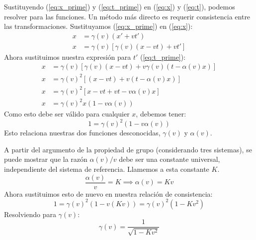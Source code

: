 \documentclass[11pt,a4paper]{article}
\begin{document}
Sustituyendo (\ref{eq:x_prime}) y (\ref{eq:t_prime}) en (\ref{eq:x}) y (\ref{eq:t}), podemos resolver para las funciones. Un método más directo es requerir consistencia entre las transformaciones. Sustituyamos (\ref{eq:x_prime}) en (\ref{eq:x}):
\begin{align*}
x &= \gamma(v)(x' + vt') \\
x &= \gamma(v)[\gamma(v)(x-vt) + v t']
\end{align*}
Ahora sustituimos nuestra expresión para $t'$ (\ref{eq:t_prime}):
\begin{align*}
x &= \gamma(v)[\gamma(v)(x-vt) + v \gamma(v)(t - \alpha(v)x)] \\
x &= \gamma(v)^2 [ (x-vt) + v(t-\alpha(v)x) ] \\
x &= \gamma(v)^2 [ x - vt + vt - v\alpha(v)x ] \\
x &= \gamma(v)^2 x (1 - v\alpha(v))
\end{align*}
Como esto debe ser válido para cualquier $x$, debemos tener:
\[ 1 = \gamma(v)^2 (1 - v\alpha(v)) \]
Esto relaciona nuestras dos funciones desconocidas, $\gamma(v)$ y $\alpha(v)$.

A partir del argumento de la propiedad de grupo (considerando tres sistemas), se puede mostrar que la razón $\alpha(v)/v$ debe ser una constante universal, independiente del sistema de referencia. Llamemos a esta constante $K$.
\[ \frac{\alpha(v)}{v} = K \implies \alpha(v) = Kv \]
Ahora sustituimos esto de nuevo en nuestra relación de consistencia:
\[ 1 = \gamma(v)^2 (1 - v(Kv)) = \gamma(v)^2 (1 - K v^2) \]
Resolviendo para $\gamma(v)$:
\[ \boxed{\gamma(v) = \frac{1}{\sqrt{1 - K v^2}}} \]
\end{document}
